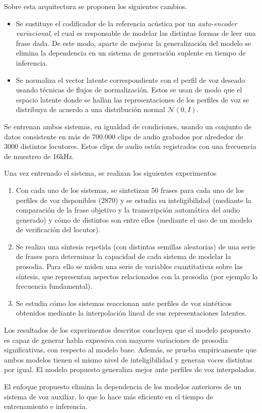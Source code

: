\documentclass[10pt,a4paper,titlepage,table]{report}
\begin{document}
Sobre esta arquitectura se proponen los siguientes cambios.

\begin{itemize}
	\item Se sustituye el codificador de la referencia acústica por un \textit{auto-encoder variacional}, el cual es responsable de modelar las distintas formas de leer una frase dada. De este modo, aparte de mejorar la generalización del modelo se elimina la dependencia en un sistema de generación suplente en tiempo de inferencia. 
	\item Se normaliza el vector latente correspondiente con el perfil de voz deseado usando técnicas de flujos de normalización. Estos se usan de modo que el espacio latente donde se hallan las representaciones de los perfiles de voz se distribuya de acuerdo a una distribución normal $\mathcal{N}(0, I)$.
\end{itemize}

Se entrenan ambos sistemas, en igualdad de condiciones, usando un conjunto de datos consistente en más de 700.000 clips de audio grabados por alrededor de 3000 distintos locutores. Estos clips de audio están registrados con una frecuencia de muestreo de 16kHz.

Una vez entrenado el sistema, se realizan los siguientes experimentos 

\begin{enumerate}
	\item Con cada uno de los sistemas, se sintetizan 50 frases para cada uno de los perfiles de voz disponibles (2870) y se estudia su inteligibilidad (mediante la comparación de la frase objetivo y la transcripción automática del audio generado) y cómo de distintos son entre ellos (mediante el uso de un modelo de verificación del locutor).
	\item Se realiza una síntesis repetida (con distintas semillas aleatorias) de una serie de frases para determinar la capacidad de cada sistema de modelar la prosodia. Para ello se miden una serie de variables cuantitativas sobre las síntesis, que representan aspectos relacionados con la prosodia (por ejemplo la frecuencia fundamental).
	\item Se estudia cómo los sistemas reaccionan ante perfiles de voz sintéticos obtenidos mediante la interpolación lineal de sus representaciones latentes.
\end{enumerate}

Los resultados de los experimentos descritos concluyen que el modelo propuesto es capaz de generar habla expresiva con mayores variaciones de prosodia significativas, con respecto al modelo base. Además, se prueba empíricamente que ambos modelos tienen el mismo nivel de inteligibilidad y generan voces distintas por igual. El modelo propuesto generaliza mejor ante perfiles de voz interpolados. 

El enfoque propuesto elimina la dependencia de los modelos anteriores de un sistema de voz auxiliar, lo que lo hace más eficiente en el tiempo de entrenamiento e inferencia.
\end{document}
